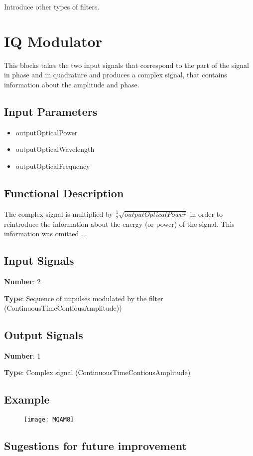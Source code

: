 \documentclass[a4paper]{article}
\begin{document}
Introduce other types of filters.

\pagebreak


\section*{IQ Modulator}

This blocks takes the two input signals that correspond to the part of the signal in phase and in quadrature and produces a complex signal, that contains information about the amplitude and phase. 

\subsection*{Input Parameters}

\begin{itemize}
	\item outputOpticalPower
	\item outputOpticalWavelength
	\item outputOpticalFrequency
\end{itemize}

\subsection*{Functional Description}

The complex signal is multiplied by $\frac{1}{2}\sqrt{\textit{outputOpticalPower}}$ in order to reintroduce the information about the energy (or power) of the signal. This information was omitted ...

\subsection*{Input Signals}

\textbf{Number}: 2

\textbf{Type}: Sequence of impulses modulated by the filter (ContinuousTimeContiousAmplitude))

\subsection*{Output Signals}

\textbf{Number}: 1

\textbf{Type}: Complex signal (ContinuousTimeContiousAmplitude)

\subsection*{Example}
\begin{figure}[h]
	\texttt{[image: MQAM8]}
\end{figure}

\subsection*{Sugestions for future improvement}
\end{document}
